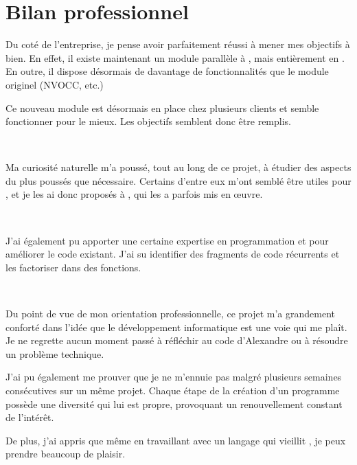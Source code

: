 \chapter{Bilan professionnel}
Du coté de l'entreprise, je pense avoir parfaitement réussi à mener mes objectifs à bien. En effet, il existe maintenant un module parallèle à \pireus, mais entièrement en \vb. En outre, il dispose désormais de davantage de fonctionnalités que le module originel (NVOCC, etc.)

Ce nouveau module est désormais en place chez plusieurs clients et semble fonctionner pour le mieux. Les objectifs semblent donc être remplis.

~

Ma curiosité naturelle m'a poussé, tout au long de ce projet, à étudier des aspects du \vb{} plus poussés que nécessaire. Certains d'entre eux m'ont semblé être utiles pour \integrale, et je les ai donc proposés à \solulog, qui les a parfois mis en \oe{uvre}.

~

J'ai également pu apporter une certaine expertise en programmation et pour améliorer le code existant. J'ai su identifier des fragments de code récurrents et les factoriser dans des fonctions.

~


Du point de vue de mon orientation professionnelle, ce projet m'a grandement conforté dans l'idée que le développement informatique est une voie qui me plaît. Je ne regrette aucun moment passé à réfléchir au code d'Alexandre ou à résoudre un problème technique.

J'ai pu également me prouver que je ne m'ennuie pas malgré plusieurs semaines consécutives sur un même projet. Chaque étape de la création d'un programme possède une diversité qui lui est propre, provoquant un renouvellement constant de l'intérêt.

De plus, j'ai appris que même en travaillant avec un langage qui \og vieillit \fg, je peux prendre beaucoup de plaisir.